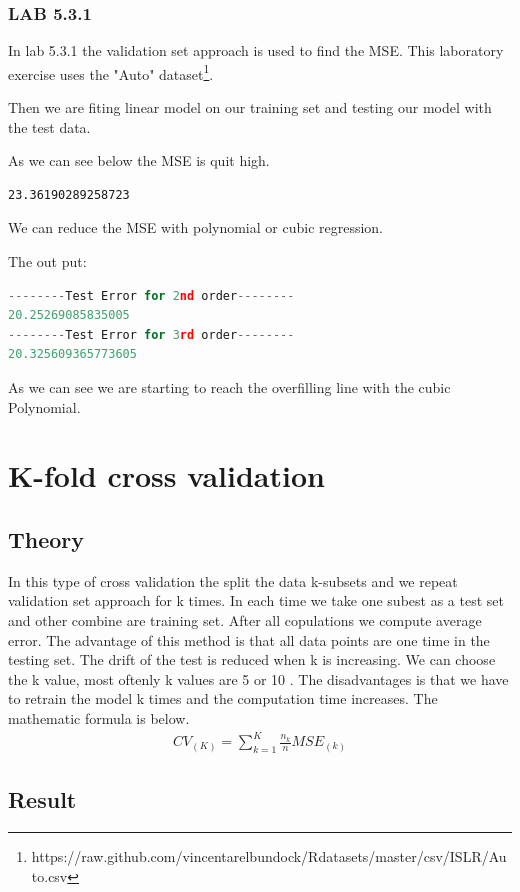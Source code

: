 \subsubsection*{LAB 5.3.1}%
In lab 5.3.1 the validation set approach is used to find the MSE. This laboratory exercise uses the "Auto" dataset\footnote{https://raw.github.com/vincentarelbundock/Rdatasets/master/csv/ISLR/Auto.csv}.

Then we are fiting linear model on our training set and testing our model with the test data.


As we can see below the MSE is quit high.
\begin{lstlisting}
23.36190289258723
\end{lstlisting}
We can reduce the MSE with polynomial or cubic regression.

The out put:
\begin{lstlisting}[language=Python]
--------Test Error for 2nd order--------
20.25269085835005
--------Test Error for 3rd order--------
20.325609365773605
\end{lstlisting}
As we can see we are starting to reach the overfilling line with the cubic Polynomial. 


\section {K-fold cross validation}%
\subsection{Theory}
In this type of cross validation the split the data k-subsets and we repeat validation set approach for k times. In each time we take one subest as a test set and other combine are training set. After all copulations we compute average error. The advantage of this method is that all data points are one time in the testing set. The drift of the test is reduced when k is increasing. We can choose the k value, most oftenly k values are 5 or 10 . The disadvantages is that we have to retrain the model k times and the computation time increases. The mathematic formula is below. 
\begin{align}\label{fo:k-fold}
CV_{(K)} = \sum_{k=1}^{K}  \frac {n_{k}}{n}MSE_{(k)}
\end{align}

\subsection{Result}
